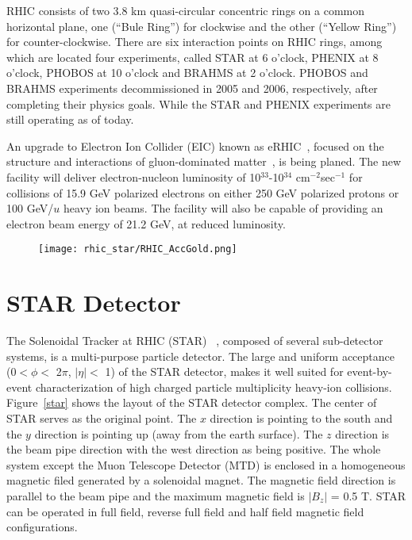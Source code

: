 RHIC consists of two 3.8 km quasi-circular concentric rings on a common horizontal plane, one (``Bule Ring'') for clockwise and the other (``Yellow Ring'') for counter-clockwise. There are six interaction points on RHIC rings, among which are located four experiments, called STAR at 6 o'clock, PHENIX at 8 o'clock, PHOBOS at 10 o'clock and BRAHMS at 2 o'clock. PHOBOS and BRAHMS experiments decommissioned in 2005 and 2006, respectively, after completing their physics goals. While the STAR and PHENIX experiments are still operating as of today.

An upgrade to Electron Ion Collider (EIC) known as eRHIC~\cite{eRHIC}, focused on the structure and interactions of gluon-dominated matter~\cite{EIC_Physics}, is being planed. The new facility will deliver electron-nucleon luminosity of 10$^{33}$-10$^{34}$ cm$^{-2}$sec$^{-1}$ for collisions of 15.9 GeV polarized electrons on either 250 GeV polarized protons or 100 GeV/$u$ heavy ion beams. The facility will also be capable of providing an electron beam energy of 21.2 GeV, at reduced luminosity. 

\begin{figure}[htbp]
\centering
\texttt{[image: rhic\_star/RHIC\_AccGold.png]}
 \label{rhic_acc}
\end{figure}

\section{STAR Detector}
\label{stardet}
The Solenoidal Tracker at RHIC (STAR) ~\cite{STARdet}, composed of several sub-detector systems, is a multi-purpose particle detector. The large and uniform acceptance (0$<\phi<$ 2$\pi$, $|\eta|<$ 1) of the STAR detector, makes it well suited for event-by-event characterization of high charged particle multiplicity heavy-ion collisions. Figure~\ref{star} shows the layout of the STAR detector complex. The center of STAR serves as the original point. The $x$ direction is pointing to the south and the $y$ direction is pointing up (away from the earth surface). The $z$ direction is the beam pipe direction with the west direction as being positive. The whole system except the Muon Telescope Detector (MTD) is enclosed in a homogeneous magnetic filed generated by a solenoidal magnet. The magnetic field direction is parallel to the beam pipe and the maximum magnetic field is $|B_{z}|$ = 0.5 T. STAR can be operated in full field, reverse full field and half field magnetic field configurations.

